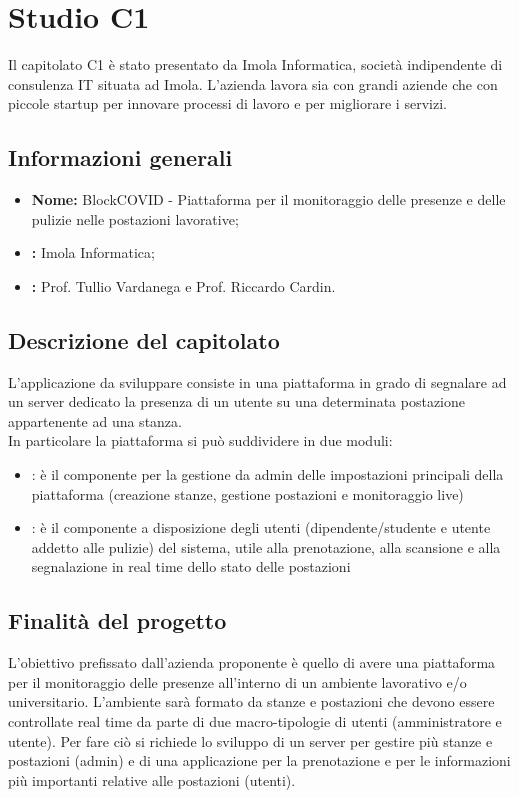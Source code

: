 \section{Studio C1}
Il capitolato C1 è stato presentato da Imola Informatica, società indipendente di consulenza IT situata ad Imola. L'azienda lavora sia con grandi aziende che con piccole startup per innovare processi di lavoro e per migliorare i servizi.\\

\subsection{Informazioni generali}
\begin{itemize}
	\item \textbf{Nome:} BlockCOVID - Piattaforma per il monitoraggio delle presenze e delle pulizie nelle postazioni lavorative;
	\item \textbf{:} Imola Informatica;
	\item \textbf{:} Prof. Tullio Vardanega e Prof. Riccardo Cardin.
\end{itemize}

\subsection{Descrizione del capitolato}
L'applicazione da sviluppare consiste in una piattaforma in grado di segnalare ad un server dedicato la presenza di un utente su una determinata postazione appartenente ad una stanza. \\
In particolare la piattaforma si può suddividere in due moduli:
\begin{itemize}
	\item {}: è il componente per la gestione da admin delle impostazioni principali della piattaforma (creazione stanze, gestione postazioni e monitoraggio live)
	\item {}: è il componente a disposizione degli utenti (dipendente/studente e utente addetto alle pulizie) del sistema, utile alla prenotazione, alla scansione e alla segnalazione in real time dello stato delle postazioni
\end{itemize}

\subsection{Finalità del progetto}
L'obiettivo prefissato dall'azienda proponente è quello di avere una piattaforma per il monitoraggio delle presenze all'interno di un ambiente lavorativo e/o universitario. L'ambiente sarà formato da stanze e postazioni che devono essere controllate real time da parte di due macro-tipologie di utenti (amministratore e utente). Per fare ciò si richiede lo sviluppo di un server per gestire più stanze e postazioni (admin) e di una applicazione per la prenotazione e per le informazioni più importanti relative alle postazioni (utenti).


